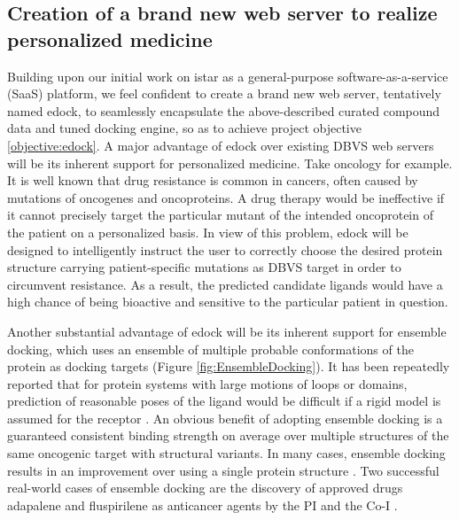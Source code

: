 \documentclass[a4paper,12pt]{article}
\begin{document}



\subsection*{Creation of a brand new web server to realize personalized medicine}

Building upon our initial work on istar \citep{1362} as a general-purpose software-as-a-service (SaaS) platform, we feel confident to create a brand new web server, tentatively named edock, to seamlessly encapsulate the above-described curated compound data and tuned docking engine, so as to achieve project objective \ref{objective:edock}. A major advantage of edock over existing DBVS web servers will be its inherent support for personalized medicine. Take oncology for example. It is well known that drug resistance is common in cancers, often caused by mutations of oncogenes and oncoproteins. A drug therapy would be ineffective if it cannot precisely target the particular mutant of the intended oncoprotein of the patient on a personalized basis. In view of this problem, edock will be designed to intelligently instruct the user to correctly choose the desired protein structure carrying patient-specific mutations as DBVS target in order to circumvent resistance. As a result, the predicted candidate ligands would have a high chance of being bioactive and sensitive to the particular patient in question.

Another substantial advantage of edock will be its inherent support for ensemble docking, which uses an ensemble of multiple probable conformations of the protein as docking targets (Figure \ref{fig:EnsembleDocking}). It has been repeatedly reported that for protein systems with large motions of loops or domains, prediction of reasonable poses of the ligand would be difficult if a rigid model is assumed for the receptor \citep{1730}. An obvious benefit of adopting ensemble docking is a guaranteed consistent binding strength on average over multiple structures of the same oncogenic target with structural variants. In many cases, ensemble docking results in an improvement over using a single protein structure \citep{1128}. Two successful real-world cases of ensemble docking are the discovery of approved drugs adapalene and fluspirilene as anticancer agents by the PI and the Co-I \citep{1667,1681}.
\end{document}
